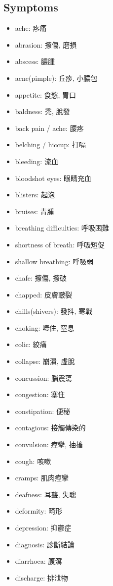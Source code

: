 \subsection{Symptoms}
\begin{multicols}{2}
\begin{itemize}
  \itemsep0em
  \item ache: 疼痛
  \item abrasion: 擦傷, 磨損
  \item abscess: 膿腫
  \item acne(pimple): 丘疹, 小膿包
  \item appetite: 食慾, 胃口
  \item baldness: 禿, 脫發
  \item back pain / ache: 腰疼
  \item belching / hiccup: 打嗝
  \item bleeding: 流血
  \item bloodshot eyes: 眼睛充血
  \item blisters: 起泡
  \item bruises: 青腫
  \item breathing difficulties: 呼吸困難
  \item shortness of breath: 呼吸短促
  \item shallow breathing: 呼吸弱
  \item chafe: 擦傷, 擦破
  \item chapped: 皮膚皸裂
  \item chills(shivers): 發抖, 寒戰
  \item choking: 噎住, 窒息
  \item colic: 絞痛
  \item collapse: 崩潰, 虛脫
  \item concussion: 腦震蕩
  \item congestion: 塞住
  \item constipation: 便秘
  \item contagious: 接觸傳染的
  \item convulsion: 痙攣, 抽搐
  \item cough: 咳嗽
  \item cramps: 肌肉痙攣
  \item deafness: 耳聾, 失聰
  \item deformity: 畸形
  \item depression: 抑鬱症
  \item diagnosis: 診斷結論
  \item diarrhoea: 腹瀉
  \item discharge: 排泄物

\end{itemize}
\end{multicols}
